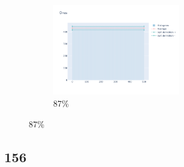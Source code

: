 \documentclass[12pt, fleqn]{report}                             %
\theoremstyle{break}                                            %
\begin{document}
\begin{figure}[ht!]
\begin{subfigure}[b]{0.4\linewidth}
          \includegraphics[width=0.6\textwidth]{Images/154/dia-d.png}
          \caption{87\%}
        \end{subfigure}
      \end{figure}


      \clearpage
      \subsection{156}
\end{document}
